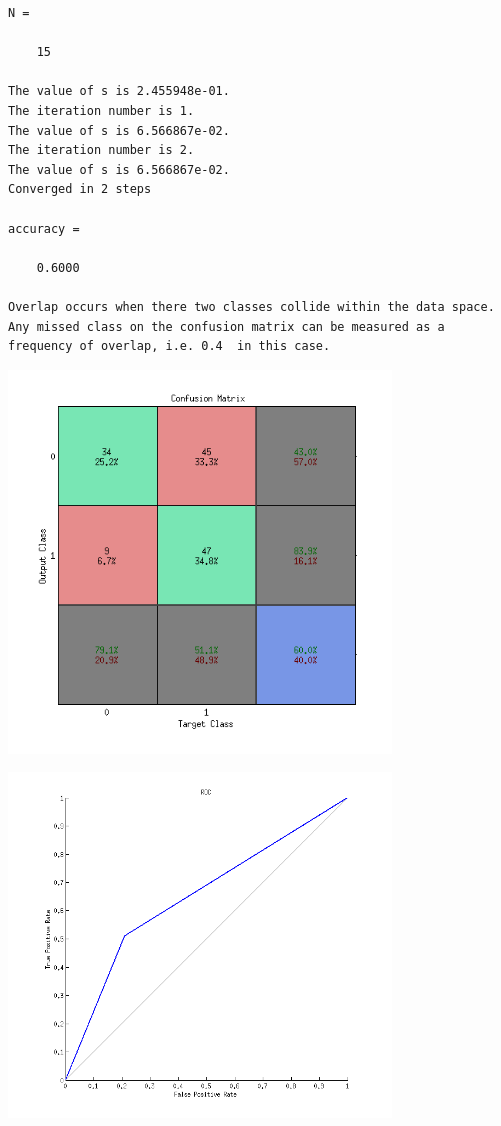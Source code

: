\documentclass[12pt,letterpaper]{article}
\begin{document}
        \color{lightgray} \begin{verbatim}
N =

    15

The value of s is 2.455948e-01.
The iteration number is 1.
The value of s is 6.566867e-02.
The iteration number is 2.
The value of s is 6.566867e-02.
Converged in 2 steps

accuracy =

    0.6000

Overlap occurs when there two classes collide within the data space. Any missed class on the confusion matrix can be measured as a frequency of overlap, i.e. 0.4  in this case.

\end{verbatim} \color{black}
    
\includegraphics [width=4in]{HW3_ViSVerCM.png}

\includegraphics [width=4in]{HW3_ViSVerROC.png}
\end{document}
